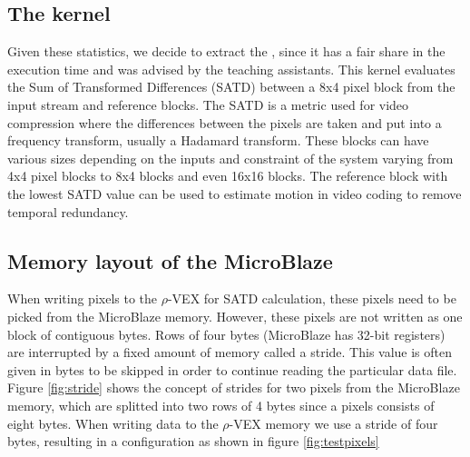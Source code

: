\subsection{The  kernel}
\label{sec:kernel}
Given these statistics, we decide to extract the , since it has a fair share in the execution time and was advised by the teaching assistants. This kernel evaluates the Sum of Transformed Differences (SATD) between a 8x4 pixel block from the input stream and reference blocks. The SATD is a metric used for video compression where the differences between the pixels are taken and put into a frequency transform, usually a Hadamard transform. These blocks can have various sizes depending on the inputs and constraint of the system varying from 4x4 pixel blocks to 8x4 blocks and even 16x16 blocks. The reference block with the lowest SATD value can be used to estimate motion in video coding to remove temporal redundancy. 

\subsection{Memory layout of the MicroBlaze}
\label{sec:layout}

When writing pixels to the $\rho$-VEX for SATD calculation, these pixels need to be picked from the MicroBlaze memory. However, these pixels are not written as one block of contiguous bytes. Rows of four bytes (MicroBlaze has 32-bit registers) are interrupted by a fixed amount of memory called a stride. This value is often given in bytes to be skipped in order to continue reading the particular data file. Figure \ref{fig:stride} shows the concept of strides for two pixels from the MicroBlaze memory, which are splitted into two rows of 4 bytes since a pixels consists of eight bytes. When writing data to the $\rho$-VEX memory we use a stride of four bytes, resulting in a configuration as shown in figure \ref{fig:testpixels}

